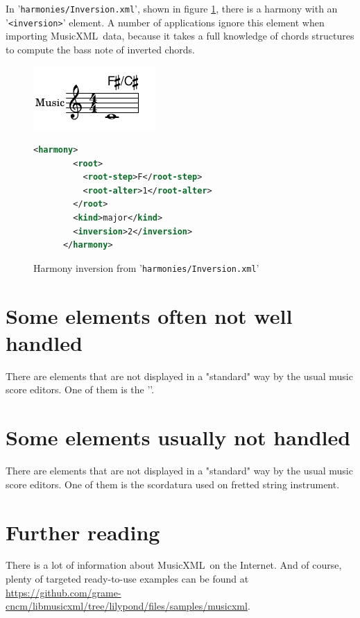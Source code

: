 \documentclass[12pt,a4paper]{article}
\newcommand{\mxml}{MusicXML}
\begin{document}
In {'\tt harmonies/Inversion.xml}', shown in figure \ref{inversion}, there is a harmony with an {'\tt <inversion>}' element. A number of applications ignore this element when importing \mxml\ data, because it takes a full knowledge of chords structures to compute the bass note of inverted chords.
\begin{figure}
\caption{Harmony inversion from {'\tt harmonies/Inversion.xml}'}\label{inversion}
\includegraphics{Inversion.png}

\begin{lstlisting}[language=XML]
      <harmony>
        <root>
          <root-step>F</root-step>
          <root-alter>1</root-alter>
        </root>
        <kind>major</kind>
        <inversion>2</inversion>
      </harmony>
\end{lstlisting}
\end{figure}

\section{Some elements often not well handled}

There are elements that are not displayed in a "standard" way by the usual music score editors. One of them is the {'\tt <beat-repeat>}'.


\section{Some elements usually not handled}

There are elements that are not displayed in a "standard" way by the usual music score editors. One of them is the scordatura used on fretted string instrument.


\section{Further reading}

There is a lot of information about \mxml\ on the Internet. And of course, plenty of targeted ready-to-use examples can be found at \url{https://github.com/grame-cncm/libmusicxml/tree/lilypond/files/samples/musicxml}.

\lstlistoflistings

\listoffigures

\tableofcontents

\end{document}

